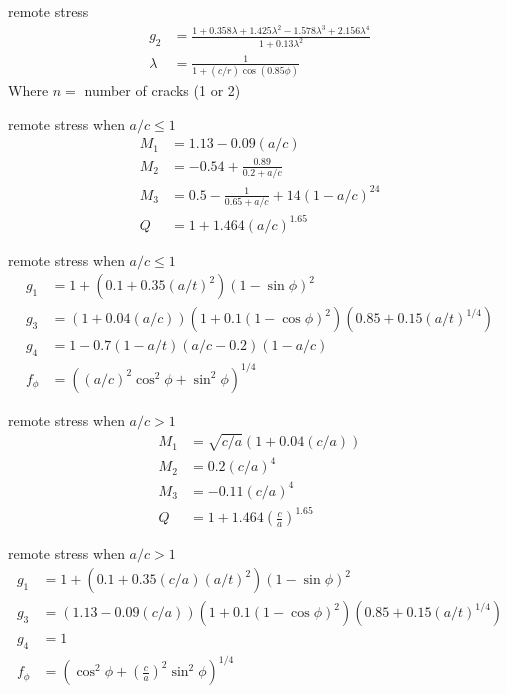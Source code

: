\documentclass[
  letterpaper,
  ignorenonframetext,
  aspectratio=43,
  handout,
  12pt]{beamer}
\begin{document}
\begin{frame}{remote stress}
\protect\hypertarget{remote-stress-1}{}
\[\begin{aligned}
  g_2 &= \frac{1+0.358\lambda+1.425\lambda^2 - 1.578\lambda^3+2.156\lambda^4}{1+0.13\lambda^2}\\
  \lambda &= \frac{1}{1+(c/r)\cos \left(0.85 \phi \right)}
\end{aligned}\] Where \(n =\) number of cracks (1 or 2)
\end{frame}

\begin{frame}{remote stress when \(a/c \le 1\)}
\protect\hypertarget{remote-stress-when-ac-le-1}{}
\[\begin{aligned}
  M_1 &= 1.13 - 0.09 \left(a/c\right)\\
  M_2 &= -0.54 + \frac{0.89}{0.2 + a/c}\\
  M_3 &= 0.5 - \frac{1}{0.65 + a/c}+ 14 \left(1-a/c\right)^{24}\\
  Q &= 1+1.464\left(a/c\right)^{1.65}
\end{aligned}\]
\end{frame}

\begin{frame}{remote stress when \(a/c \le 1\)}
\protect\hypertarget{remote-stress-when-ac-le-1-1}{}
\[\begin{aligned}
  g_1 &= 1 + \left(0.1+0.35 \left(a/t\right)^2\right)(1-\sin \phi)^2\\
  g_3 &= (1+0.04 (a/c))\left(1+0.1(1-\cos \phi)^2\right)\left(0.85+0.15(a/t)^{1/4}\right)\\
  g_4 &= 1 - 0.7(1-a/t)(a/c-0.2)(1-a/c)\\
  f_\phi &= \left(\left(a/c\right)^2 \cos^2 \phi + \sin^2 \phi \right)^{1/4}
\end{aligned}\]
\end{frame}

\begin{frame}{remote stress when \(a/c > 1\)}
\protect\hypertarget{remote-stress-when-ac-1}{}
\[\begin{aligned}
  M_1 &= \sqrt{c/a}(1+0.04 (c/a))\\
  M_2 &= 0.2(c/a)^4\\
  M_3 &= -0.11(c/a)^4\\
  Q &= 1+1.464\left(\frac{c}{a}\right)^{1.65}
\end{aligned}\]
\end{frame}

\begin{frame}{remote stress when \(a/c > 1\)}
\protect\hypertarget{remote-stress-when-ac-1-1}{}
\[\begin{aligned}
  g_1 &= 1 + \left(0.1+0.35 (c/a)\left(a/t\right)^2\right)(1-\sin \phi)^2\\
  g_3 &= (1.13-0.09 (c/a))\left(1+0.1(1-\cos \phi)^2\right)\left(0.85+0.15(a/t)^{1/4}\right)\\
  g_4 &= 1 \\
  f_\phi &= \left(\cos^2 \phi + \left(\frac{c}{a}\right)^2 \sin^2 \phi \right)^{1/4}
\end{aligned}\]
\end{frame}
\end{document}

